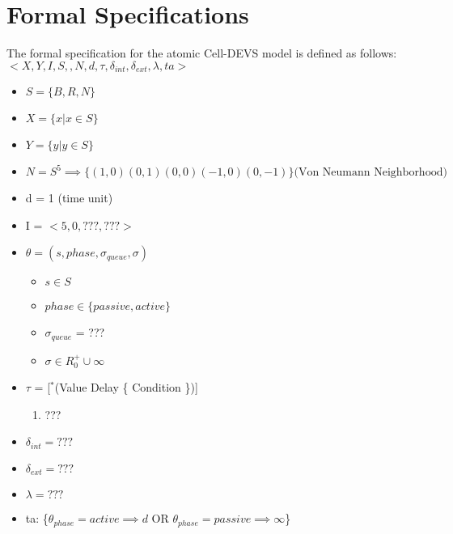 \documentclass[11pt]{article}
\begin{document}
    \newpage
    \section{Formal Specifications}
    The formal specification for the atomic Cell-DEVS model is defined as follows:\\
$<X, Y, I, S, $\theta$, N, d, \tau, \delta_{int}, \delta_{ext}, \lambda, ta>$
    \begin{itemize}
        \item $S = \{B, R, N\}$
        \item $X = \{x | x \in S\}$
        \item $Y = \{y | y \in S\}$
        \item $N = S^5 \implies \{(1,0)(0,1)(0,0)(-1,0)(0,-1)\} \text{(Von Neumann Neighborhood)}$
        \item d = 1 (time unit)
        \item  I = $< 5, 0, ???, ???>$
        \item $\theta = (s, phase, \sigma_{queue}, \sigma)$
        \begin{itemize}
            \item $s \in S$
            \item $phase \in \{passive, active\}$
            \item $\sigma_{queue}$ = ???
            \item $\sigma \in R_0^+ \cup \infty$
        \end{itemize}
        \item $\tau$ = [$^*$(Value Delay \{ Condition \})]
        \begin{enumerate}
            \item ???
        \end{enumerate}
        \item $\delta_{int} = ???$ %
        \item $\delta_{ext} = ???$ %
        \item $\lambda = ???$ %
        \item ta: \{$\theta_{phase} = active \implies d$ OR $\theta_{phase} = passive \implies \infty$\}
    \end{itemize}
\end{document}
